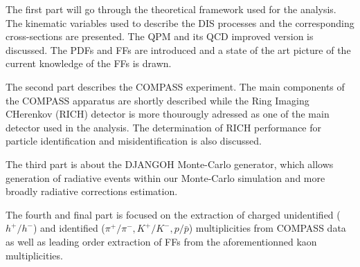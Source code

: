 The first part will go through the theoretical framework used for the analysis. The kinematic variables used to describe the DIS processes and the corresponding cross-sections are presented. The QPM and its QCD improved version is discussed. The PDFs and FFs are introduced and a state of the art picture of the current knowledge of the FFs is drawn.

The second part describes the COMPASS experiment. The main components of the COMPASS apparatus are shortly described while the Ring Imaging CHerenkov (RICH) detector is more thourougly adressed as one of the main detector used in the analysis. The determination of RICH performance for particle identification and misidentification is also discussed.

The third part is about the DJANGOH Monte-Carlo generator, which allows generation of radiative events within our Monte-Carlo simulation and more broadly radiative corrections estimation.

The fourth and final part is focused on the extraction of charged unidentified ($h^+/h^-$) and identified ($\pi^+/\pi^-,K^+/K^-,p/\bar{p}$) multiplicities from COMPASS data as well as leading order extraction of FFs from the aforementionned kaon multiplicities.
